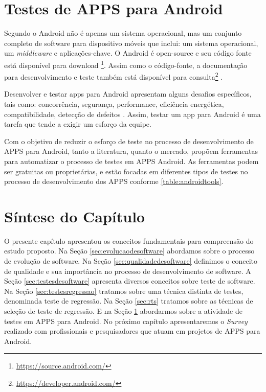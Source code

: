 \section{Testes de \ac{APPS} para Android}\label{testesAndroid}

Segundo  o Android não é apenas um sistema operacional, mas um conjunto completo de software para dispositivo móveis que inclui: um sistema operacional, um \textit{middleware} e aplicações-chave. O Android é open-source e seu código fonte está disponível para download \footnote{\url{https://source.android.com/}}. Assim como o código-fonte, a documentação para desenvolvimento e teste também está disponível para consulta\footnote{\url{https://developer.android.com/}} . 

Desenvolver e testar apps para Android apresentam alguns desafios específicos, tais como: concorrência, segurança, performance, eficiência energética, compatibilidade, detecção de defeitos \cite{8453877}. Assim, testar um app para Android é uma tarefa que tende a exigir um esforço da equipe. 

Com o objetivo de reduzir o esforço de teste no processo de desenvolvimento de \ac{APPS} para Android, tanto a literatura, quanto o mercado, propõem ferramentas para automatizar o processo de testes em \ac{APPS} Android. As ferramentas podem ser gratuitas ou proprietárias, e estão focadas em diferentes tipos de testes no processo de desenvolvimento dos \ac{APPS} conforme \ref{table:androidtools}.

\section{Síntese do Capítulo}\label{sec:sintesecapitulo}

O presente capítulo apresentou os conceitos fundamentais para compreensão do estudo proposto. Na Seção \ref{sec:evolucaodesoftware} abordamos sobre o processo de evolução de software. Na Seção \ref{sec:qualidadedesoftware} definimos o conceito de qualidade e sua importância no processo de desenvolvimento de software. A Seção \ref{sec:testesdesoftware} apresenta diversos conceitos sobre teste de software. Na Seção \ref{sec:testesregressao} tratamos sobre uma técnica distinta de testes, denominada teste de regressão. Na Seção \ref{sec:rts} tratamos sobre as técnicas de seleção de teste de regressão. E na Seção \ref{testesAndroid} abordarmos sobre a atividade de testes em \ac{APPS} para Android. No próximo capítulo apresentaremos o \textit{Survey} realizado com profissionais e pesquisadores que atuam em projetos de \ac{APPS} para Android.